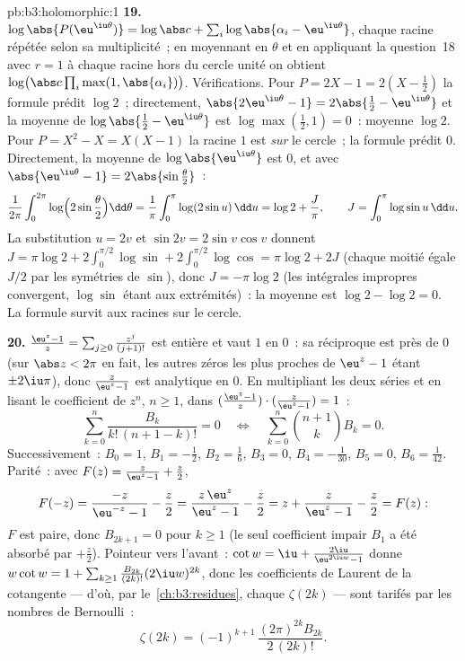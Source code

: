 \begin{solution}{pb:b3:holomorphic:1}
\textbf{19.} $\log\abs{P(\eu^{\iu\theta})} = \log\abs c +
\sum_i\log\abs{\alpha_i - \eu^{\iu\theta}}$, chaque racine
répétée selon sa multiplicité~; en moyennant en $\theta$ et
en appliquant la question~18 avec $r = 1$ à chaque racine
hors du cercle unité on obtient $\log\bigl(\abs
c\prod_i\max(1, \abs{\alpha_i})\bigr)$. Vérifications. Pour
$P = 2X - 1 = 2(X - \frac12)$ la formule prédit $\log 2$~;
directement, $\abs{2\eu^{\iu\theta} - 1} = 2\abs{\frac12 -
\eu^{\iu\theta}}$ et la moyenne de $\log\abs{\frac12 -
\eu^{\iu\theta}}$ est $\log\max(\frac12, 1) = 0$~: moyenne
$\log 2$. Pour $P = X^2 - X = X(X - 1)$ la racine $1$ est
\emph{sur} le cercle~; la formule prédit $0$. Directement,
la moyenne de $\log\abs{\eu^{\iu\theta}}$ est $0$, et avec
$\abs{\eu^{\iu\theta} - 1} = 2\abs{\sin\frac\theta2}$~:
\[
\frac1{2\pi}\int_0^{2\pi}
\log\Bigl(2\sin\frac\theta2\Bigr)\dd\theta
= \frac1\pi\int_0^\pi\log(2\sin u)\,\dd u
= \log 2 + \frac J\pi,
\qquad J = \int_0^\pi\log\sin u\,\dd u .
\]
La substitution $u = 2v$ et $\sin 2v = 2\sin v\cos v$ donnent
$J = \pi\log2 + 2\int_0^{\pi/2}\log\sin +
2\int_0^{\pi/2}\log\cos = \pi\log 2 + 2J$ (chaque moitié
égale $J/2$ par les symétries de $\sin$), donc $J = -\pi\log
2$ (les intégrales impropres convergent, $\log\sin$ étant
 aux extrémités)~: la moyenne est $\log2 - \log2 =
0$. La formule survit aux racines sur le cercle.

\textbf{20.} $\frac{\eu^z - 1}z =
\sum_{j\geq0}\frac{z^j}{(j+1)!}$ est entière et vaut $1$ en
$0$~: sa réciproque est  près de $0$ (sur $\abs z
< 2\pi$ en fait, les autres zéros les plus proches de
$\eu^z - 1$ étant $\pm2\iu\pi$), donc $\frac z{\eu^z-1}$ est
analytique en $0$. En multipliant les deux séries et en
lisant le coefficient de $z^n$, $n \geq 1$, dans
$(\frac{\eu^z-1}z)\cdot(\frac z{\eu^z-1}) = 1$~:
\[
\sum_{k=0}^{n}\frac{B_k}{k!\,(n+1-k)!} = 0
\quad\Longleftrightarrow\quad
\sum_{k=0}^{n}\binom{n+1}{k}B_k = 0 .
\]
Successivement~: $B_0 = 1$, $B_1 = -\frac12$, $B_2 =
\frac16$, $B_3 = 0$, $B_4 = -\frac1{30}$, $B_5 = 0$, $B_6 =
\frac1{42}$. Parité~: avec $F(z) = \frac z{\eu^z-1} +
\frac z2$,
\[
F(-z) = \frac{-z}{\eu^{-z} - 1} - \frac z2
= \frac{z\,\eu^z}{\eu^z - 1} - \frac z2
= z + \frac{z}{\eu^z - 1} - \frac z2 = F(z) :
\]
$F$ est paire, donc $B_{2k+1} = 0$ pour $k \geq 1$ (le seul
coefficient impair $B_1$ a été absorbé par $+\frac z2$).
Pointeur vers l'avant~: $\cot w = \iu +
\frac{2\iu}{\eu^{2\iu w}-1}$ donne $w\cot w = 1 +
\sum_{k\geq1}\frac{B_{2k}}{(2k)!}(2\iu w)^{2k}$, donc les
coefficients de Laurent de la cotangente --- d'où, par
le~\cref{ch:b3:residues}, chaque $\zeta(2k)$ --- sont
tarifés par les nombres de Bernoulli~:
\[
\zeta(2k) = (-1)^{k+1}\,\frac{(2\pi)^{2k}B_{2k}}{2\,(2k)!} .
\]


\end{solution}

